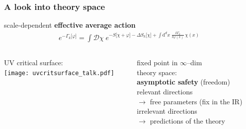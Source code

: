 \documentclass[]{beamer}  %
\begin{document}
\addtocounter{framenumber}{-1}
\begin{frame}
  \frametitle{A look into theory space}
  \vspace{7.5pt}
  scale-dependent \textbf{effective average action}
  \begin{align*}
    \boxed{
    e^{ - \Gamma_k \lbrack \varphi \rbrack }
    = \int \mathcal D \chi \;
    e^{
      - S \lbrack \chi + \varphi \rbrack
      - \Delta S_k \lbrack \chi \rbrack
      + \int \mathrm d^dx \;
      \frac{ \delta \Gamma_k }{ \delta \varphi (x) }
      \, \chi(x)
    }
    }
  \end{align*}
  \vspace{2pt}

  \begin{columns}[T]
    \begin{column}{.6\textwidth}
      UV critical surface:\\[10pt]
      \texttt{[image: uvcritsurface\_talk.pdf]}
    \end{column}
    \begin{column}{.4\textwidth}
      \begin{center}
        fixed point in $\infty$--dim\\ theory space:\\
        \textbf{asymptotic safety} (freedom)\\[20pt]
        relevant directions\\[3pt]
        $\rightarrow$ free parameters (fix in the IR)\\[10pt]
        irrelevant directions\\[3pt]
        $\rightarrow$ predictions of the theory
      \end{center}
    \end{column}
  \end{columns}
\end{frame}
\end{document}
